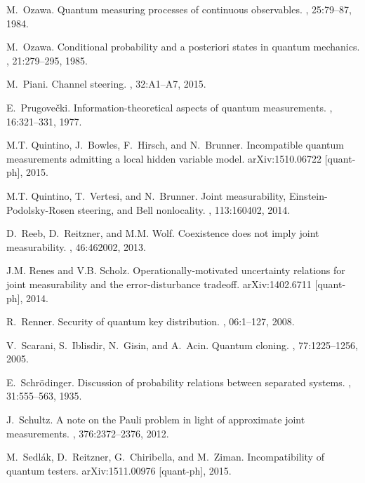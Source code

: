 \documentclass[12pt]{article}
\theoremstyle{definition}
\begin{document}
{\begin{thebibliography}{10}
M.~Ozawa.
\newblock Quantum measuring processes of continuous observables.
, 25:79--87, 1984.

M.~Ozawa.
\newblock Conditional probability and a posteriori states in quantum mechanics.
, 21:279--295, 1985.

M.~Piani.
\newblock Channel steering.
, 32:A1--A7, 2015.

E.~Prugove\v{c}ki.
\newblock Information-theoretical aspects of quantum measurements.
, 16:321--331, 1977.

M.T. Quintino, J.~Bowles, F.~Hirsch, and N.~Brunner.
\newblock Incompatible quantum measurements admitting a local hidden variable
  model.
\newblock arXiv:1510.06722 [quant-ph], 2015.

M.T. Quintino, T.~Vertesi, and N.~Brunner.
\newblock Joint measurability, {E}instein-{P}odolsky-{R}osen steering, and
  {B}ell nonlocality.
, 113:160402, 2014.

D.~Reeb, D.~Reitzner, and M.M. Wolf.
\newblock Coexistence does not imply joint measurability.
, 46:462002, 2013.

J.M. Renes and V.B. Scholz.
\newblock Operationally-motivated uncertainty relations for joint measurability
  and the error-disturbance tradeoff.
\newblock arXiv:1402.6711 [quant-ph], 2014.

R.~Renner.
\newblock Security of quantum key distribution.
, 06:1--127, 2008.

V.~Scarani, S.~Iblisdir, N.~Gisin, and A.~Acin.
\newblock Quantum cloning.
, 77:1225--1256, 2005.

E.~Schr{\"o}dinger.
\newblock Discussion of probability relations between separated systems.
, 31:555--563, 1935.

J.~Schultz.
\newblock A note on the {P}auli problem in light of approximate joint
  measurements.
, 376:2372--2376, 2012.

M.~Sedl{\'a}k, D.~Reitzner, G.~Chiribella, and M.~Ziman.
\newblock Incompatibility of quantum testers.
\newblock arXiv:1511.00976 [quant-ph], 2015.


\end{thebibliography}}
\end{document}
